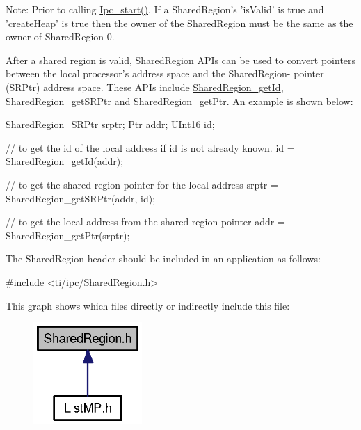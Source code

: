 Note\-: Prior to calling \hyperlink{_ipc_8h_aca550c6a5498637cfec7b0f4e6d07828}{Ipc\-\_\-start()}, If a Shared\-Region's 'is\-Valid' is true and 'create\-Heap' is true then the owner of the Shared\-Region must be the same as the owner of Shared\-Region 0.

After a shared region is valid, Shared\-Region A\-P\-Is can be used to convert pointers between the local processor's address space and the Shared\-Region-\/ pointer (S\-R\-Ptr) address space. These A\-P\-Is include \hyperlink{_shared_region_8h_afc6f82dd851547d6d6221a779be945dd}{Shared\-Region\-\_\-get\-Id}, \hyperlink{_shared_region_8h_a7362baec546e36b21e82f35746b4ab3b}{Shared\-Region\-\_\-get\-S\-R\-Ptr} and \hyperlink{_shared_region_8h_a2b64c07cb305a034417a42fb1ed8e7a9}{Shared\-Region\-\_\-get\-Ptr}. An example is shown below\-:


\begin{DoxyCode}
    SharedRegion_SRPtr srptr;
    Ptr     addr;
    UInt16  id;
  
    \textcolor{comment}{// to get the id of the local address if id is not already known.}
    \textcolor{keywordtype}{id} = SharedRegion_getId(addr);
  
    \textcolor{comment}{// to get the shared region pointer for the local address}
    srptr = SharedRegion_getSRPtr(addr, \textcolor{keywordtype}{id});
  
    \textcolor{comment}{// to get the local address from the shared region pointer}
    addr = SharedRegion_getPtr(srptr);
\end{DoxyCode}


The Shared\-Region header should be included in an application as follows\-: 
\begin{DoxyCode}
\textcolor{preprocessor}{    #include <ti/ipc/SharedRegion.h>}
\end{DoxyCode}
 

This graph shows which files directly or indirectly include this file\-:
\nopagebreak
\begin{figure}[H]
\begin{center}
\leavevmode
\includegraphics[width=117pt]{_shared_region_8h__dep__incl}
\end{center}
\end{figure}
